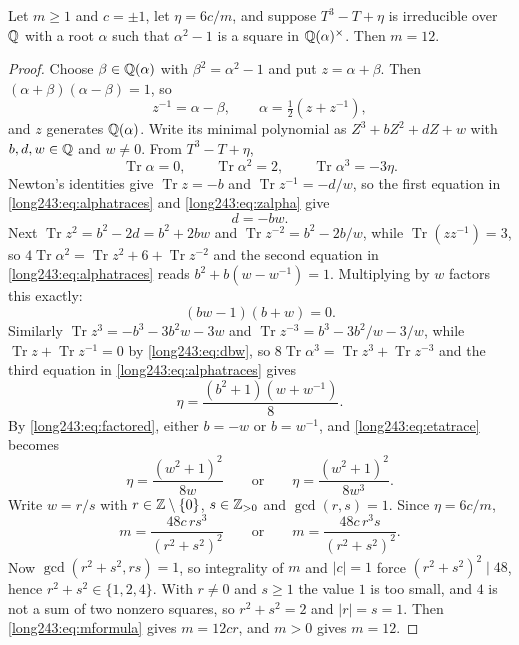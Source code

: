 \documentclass[11pt]{article}
\DeclareMathOperator{\Tr}{Tr}
\begin{document}
\begin{lemma}\label{long243:res:scaletwelve}
Let $m\ge1$ and $c=\pm1$, let $\eta=6c/m$, and suppose $T^3-T+\eta$ is
irreducible over $\mathbb{Q}$ with a root $\alpha$ such that $\alpha^2-1$ is a square
in $\mathbb{Q}(\alpha)^\times$.  Then $m=12$.
\end{lemma}

\begin{proof}
Choose $\beta\in\mathbb{Q}(\alpha)$ with $\beta^2=\alpha^2-1$ and put $z=\alpha+\beta$.
Then $(\alpha+\beta)(\alpha-\beta)=1$, so
\begin{equation}\label{long243:eq:zalpha}
 z^{-1}=\alpha-\beta,\qquad \alpha=\tfrac12(z+z^{-1}),
\end{equation}
and $z$ generates $\mathbb{Q}(\alpha)$.  Write its minimal polynomial as
$Z^3+bZ^2+dZ+w$ with $b,d,w\in\mathbb{Q}$ and $w\ne0$.  From $T^3-T+\eta$,
\begin{equation}\label{long243:eq:alphatraces}
 \Tr\alpha=0,\qquad \Tr\alpha^2=2,\qquad \Tr\alpha^3=-3\eta .
\end{equation}
Newton's identities give $\Tr z=-b$ and $\Tr z^{-1}=-d/w$, so the first
equation in \eqref{long243:eq:alphatraces} and \eqref{long243:eq:zalpha} give
\begin{equation}\label{long243:eq:dbw}
 d=-bw .
\end{equation}
Next $\Tr z^2=b^2-2d=b^2+2bw$ and $\Tr z^{-2}=b^2-2b/w$, while
$\Tr(zz^{-1})=3$, so $4\Tr\alpha^2=\Tr z^2+6+\Tr z^{-2}$ and the second
equation in \eqref{long243:eq:alphatraces} reads $b^2+b(w-w^{-1})=1$.  Multiplying by
$w$ factors this exactly:
\begin{equation}\label{long243:eq:factored}
 (bw-1)(b+w)=0 .
\end{equation}
Similarly $\Tr z^3=-b^3-3b^2w-3w$ and $\Tr z^{-3}=b^3-3b^2/w-3/w$, while
$\Tr z+\Tr z^{-1}=0$ by \eqref{long243:eq:dbw}, so
$8\Tr\alpha^3=\Tr z^3+\Tr z^{-3}$ and the third equation in
\eqref{long243:eq:alphatraces} gives
\begin{equation}\label{long243:eq:etatrace}
 \eta=\frac{(b^2+1)(w+w^{-1})}8 .
\end{equation}
By \eqref{long243:eq:factored}, either $b=-w$ or $b=w^{-1}$, and \eqref{long243:eq:etatrace}
becomes
\[
 \eta=\frac{(w^2+1)^2}{8w}
 \qquad\text{or}\qquad
 \eta=\frac{(w^2+1)^2}{8w^3}.
\]
Write $w=r/s$ with $r\in\mathbb{Z}\mathbin{\backslash}\{0\}$, $s\in\mathbb{Z}_{>0}$ and $\gcd(r,s)=1$.
Since $\eta=6c/m$,
\begin{equation}\label{long243:eq:mformula}
 m=\frac{48c\,rs^3}{(r^2+s^2)^2}
 \qquad\text{or}\qquad
 m=\frac{48c\,r^3s}{(r^2+s^2)^2}.
\end{equation}
Now $\gcd(r^2+s^2,rs)=1$, so integrality of $m$ and $|c|=1$ force
$(r^2+s^2)^2\mid48$, hence $r^2+s^2\in\{1,2,4\}$.  With $r\ne0$ and $s\ge1$ the
value $1$ is too small, and $4$ is not a sum of two nonzero squares, so
$r^2+s^2=2$ and $|r|=s=1$.  Then \eqref{long243:eq:mformula} gives $m=12cr$, and
$m>0$ gives $m=12$.
\end{proof}
\end{document}
